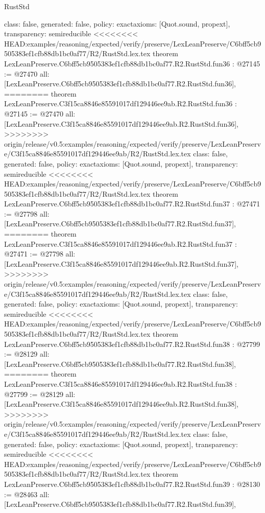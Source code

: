 \begin{lexlean}{RustStd}
\begin{coremodule}
{\begin{coremodule}
{{{{{{{{{{{{{{{{{{{{{{{{{{{{{{{{{{{{{{{  class: false,
  generated: false,
  policy: exact{axioms: [Quot.sound, propext]},
  transparency: semireducible
}
<<<<<<<< HEAD:examples/reasoning/expected/verify/preserve/LexLeanPreserve/C6bff5cb9505383ef1cfb88db1bc0af77/R2/RustStd.lex.tex
theorem LexLeanPreserve.C6bff5cb9505383ef1cfb88db1bc0af77.R2.RustStd.fun36 : @27145 := @27470 {
  all: [LexLeanPreserve.C6bff5cb9505383ef1cfb88db1bc0af77.R2.RustStd.fun36],
========
theorem LexLeanPreserve.C3f15ca8846e85591017df129446ee9ab.R2.RustStd.fun36 : @27145 := @27470 {
  all: [LexLeanPreserve.C3f15ca8846e85591017df129446ee9ab.R2.RustStd.fun36],
>>>>>>>> origin/release/v0.5:examples/reasoning/expected/verify/preserve/LexLeanPreserve/C3f15ca8846e85591017df129446ee9ab/R2/RustStd.lex.tex
  class: false,
  generated: false,
  policy: exact{axioms: [Quot.sound, propext]},
  transparency: semireducible
}
<<<<<<<< HEAD:examples/reasoning/expected/verify/preserve/LexLeanPreserve/C6bff5cb9505383ef1cfb88db1bc0af77/R2/RustStd.lex.tex
theorem LexLeanPreserve.C6bff5cb9505383ef1cfb88db1bc0af77.R2.RustStd.fun37 : @27471 := @27798 {
  all: [LexLeanPreserve.C6bff5cb9505383ef1cfb88db1bc0af77.R2.RustStd.fun37],
========
theorem LexLeanPreserve.C3f15ca8846e85591017df129446ee9ab.R2.RustStd.fun37 : @27471 := @27798 {
  all: [LexLeanPreserve.C3f15ca8846e85591017df129446ee9ab.R2.RustStd.fun37],
>>>>>>>> origin/release/v0.5:examples/reasoning/expected/verify/preserve/LexLeanPreserve/C3f15ca8846e85591017df129446ee9ab/R2/RustStd.lex.tex
  class: false,
  generated: false,
  policy: exact{axioms: [Quot.sound, propext]},
  transparency: semireducible
}
<<<<<<<< HEAD:examples/reasoning/expected/verify/preserve/LexLeanPreserve/C6bff5cb9505383ef1cfb88db1bc0af77/R2/RustStd.lex.tex
theorem LexLeanPreserve.C6bff5cb9505383ef1cfb88db1bc0af77.R2.RustStd.fun38 : @27799 := @28129 {
  all: [LexLeanPreserve.C6bff5cb9505383ef1cfb88db1bc0af77.R2.RustStd.fun38],
========
theorem LexLeanPreserve.C3f15ca8846e85591017df129446ee9ab.R2.RustStd.fun38 : @27799 := @28129 {
  all: [LexLeanPreserve.C3f15ca8846e85591017df129446ee9ab.R2.RustStd.fun38],
>>>>>>>> origin/release/v0.5:examples/reasoning/expected/verify/preserve/LexLeanPreserve/C3f15ca8846e85591017df129446ee9ab/R2/RustStd.lex.tex
  class: false,
  generated: false,
  policy: exact{axioms: [Quot.sound, propext]},
  transparency: semireducible
}
<<<<<<<< HEAD:examples/reasoning/expected/verify/preserve/LexLeanPreserve/C6bff5cb9505383ef1cfb88db1bc0af77/R2/RustStd.lex.tex
theorem LexLeanPreserve.C6bff5cb9505383ef1cfb88db1bc0af77.R2.RustStd.fun39 : @28130 := @28463 {
  all: [LexLeanPreserve.C6bff5cb9505383ef1cfb88db1bc0af77.R2.RustStd.fun39],
}}}}}}}}}}}}}}}}}}}}}}}}}}}}}}}}}}}}}}}}}}
\end{coremodule}}
\end{coremodule}
\end{lexlean}
